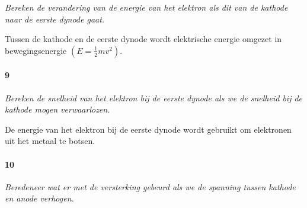 \textit{Bereken de verandering van de energie van het elektron als dit van de kathode
naar de eerste dynode gaat.}

Tussen de kathode en de eerste dynode wordt elektrische energie omgezet
in bewegingsenergie $\left(E=\frac{1}{2}mv^{2}\right)$.


\paragraph{9}

\textit{Bereken de snelheid van het elektron bij de eerste dynode
als we de snelheid bij de kathode mogen verwaarlozen.}

De energie van het elektron bij de eerste dynode wordt gebruikt om
elektronen uit het metaal te botsen.


\paragraph{10}

\textit{Beredeneer wat er met de versterking gebeurd als we de spanning
tussen kathode en anode verhogen.}

